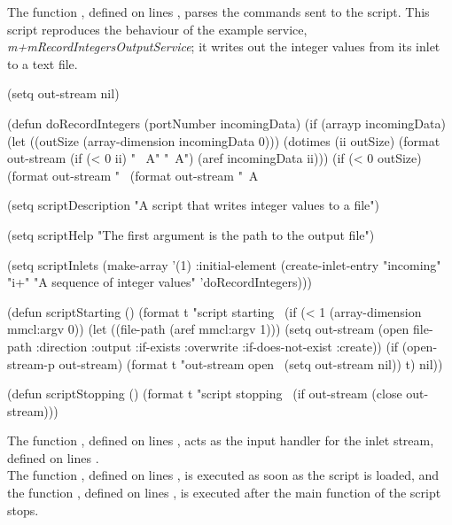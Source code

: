 The function , defined on lines \longDash{},
parses the commands sent to the script.
\secondaryEnd
\condPage
{}
This script reproduces the behaviour of the example service,
\emph{m+mRecordIntegersOutputService}; it writes out the integer values from its inlet to
a text file.
\codeBegin
\begin{listing}[5]{1}
(setq out-stream nil)

(defun doRecordIntegers (portNumber incomingData)
  (if (arrayp incomingData)
      (let ((outSize (array-dimension incomingData 0)))
	(dotimes (ii outSize)
	  (format out-stream (if (< 0 ii) " ~A" "~A") (aref incomingData ii)))
	(if (< 0 outSize) (format out-stream "~%
    (format out-stream "~A~%

(setq scriptDescription "A script that writes integer values to a file")

(setq scriptHelp "The first argument is the path to the output file")

(setq scriptInlets (make-array '(1) :initial-element
			       (create-inlet-entry "incoming" "i+"
						   "A sequence of integer values"
						   'doRecordIntegers)))

(defun scriptStarting ()
  (format t "script starting~%
  (if (< 1 (array-dimension mmcl:argv 0))
      (let ((file-path (aref mmcl:argv 1)))
	(setq out-stream (open file-path :direction :output
			       :if-exists :overwrite
			       :if-does-not-exist :create))
	(if (open-stream-p out-stream)
	    (format t "out-stream open~%
	  (setq out-stream nil))
	t)
    nil))

(defun scriptStopping ()
  (format t "script stopping~%
  (if out-stream (close out-stream)))
\end{listing}
\codeEnd{}
The function , defined on lines \longDash{},
acts as the input handler for the inlet stream, defined on lines
\longDash{}.\\

The function , defined on lines \longDash{},
is executed as soon as the script is loaded, and the function ,
defined on lines \longDash{}, is executed after the main function of
the script stops.\\

